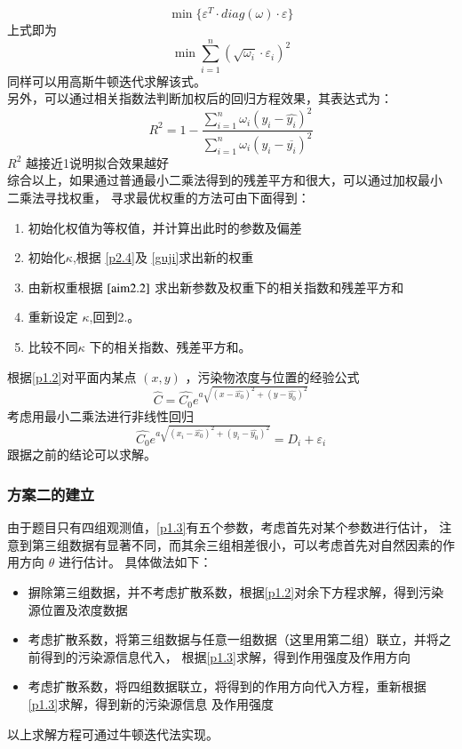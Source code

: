 \documentclass[UTF8]{ctexart}
\begin{document}
    \begin{equation}\label{aim2.2}
      \min{\{\varepsilon^T\cdot diag(\omega) \cdot \varepsilon\}}
    \end{equation}
    上式即为
    \begin{equation}
      \min{\sum_{i=1}^n {(\sqrt{\omega_i}\cdot\varepsilon_i)^2}}
    \end{equation}
    同样可以用高斯牛顿迭代求解该式。\\
    另外，可以通过相关指数法判断加权后的回归方程效果，其表达式为：
    $$ R^2=1-\frac{\sum\limits_{i=1}^n \omega_i(y_i-\hat{y_i})^2}{\sum\limits_{i=1}^n
     \omega_i(y_i-\overline{y_i})^2}$$
    $R^2$ 越接近1说明拟合效果越好\\
    综合以上，如果通过普通最小二乘法得到的残差平方和很大，可以通过加权最小
    二乘法寻找权重，
    寻求最优权重的方法可由下面得到：
    \begin{enumerate}\label{solve2.1}
      \item 初始化权值为等权值，并计算出此时的参数及偏差
      \item 初始化$\kappa$,根据 \ref{p2.4}及 \ref{guji}求出新的权重
      \item 由新权重根据 $\ref{aim2.2}$ 求出新参数及权重下的相关指数和残差平方和
      \item 重新设定 $\kappa$,回到2.。
      \item 比较不同$\kappa$ 下的相关指数、残差平方和。
    \end{enumerate}

  根据\ref{p1.2}对平面内某点 $(x,y)$ ，污染物浓度与位置的经验公式
     \begin{equation}\label{p2.1}
        \hat{C}=\hat{C_0} e^{a\sqrt{(x-\hat{x_0})^2+(y-\hat{y_0})^2}}
     \end{equation}
  考虑用最小二乘法进行非线性回归
    $$ \hat{C_0} e^{a \sqrt{(x_i-\hat{x_0})^2+(y_i-
    \hat{y_0})^2}}=D_i+\varepsilon_i $$
  跟据之前的结论可以求解。
  \subsubsection{方案二的建立}
  由于题目只有四组观测值，\ref{p1.3}有五个参数，考虑首先对某个参数进行估计，
  注意到第三组数据有显著不同，而其余三组相差很小，可以考虑首先对自然因素的作用方向 $\theta$ 进行估计。
  具体做法如下：
 \begin{itemize}\label{p2.2.1}
   \item 摒除第三组数据，并不考虑扩散系数，根据\ref{p1.2}对余下方程求解，得到污染源位置及浓度数据
   \item 考虑扩散系数，将第三组数据与任意一组数据（这里用第二组）联立，并将之前得到的污染源信息代入，
   根据\ref{p1.3}求解，得到作用强度及作用方向
   \item 考虑扩散系数，将四组数据联立，将得到的作用方向代入方程，重新根据\ref{p1.3}求解，得到新的污染源信息
   及作用强度
 \end{itemize}
 以上求解方程可通过牛顿迭代法实现。
\end{document}
